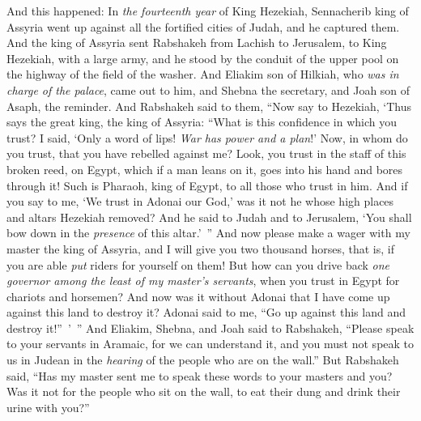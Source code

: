\begin{biblechapter} %
 And this happened: In \textit{the fourteenth year} of King Hezekiah, Sennacherib king of Assyria went up against all the fortified cities of Judah, and he captured them.
\verse And the king of Assyria sent Rabshakeh from Lachish to Jerusalem, to King Hezekiah, with a large army, and he stood by the conduit of the upper pool on the highway of the field of the washer.
\verse And Eliakim son of Hilkiah, who \textit{was in charge of the palace}, came out to him, and Shebna the secretary, and Joah son of Asaph, the reminder.
\verse And Rabshakeh said to them, “Now say to Hezekiah, ‘Thus says the great king, the king of Assyria: “What is this confidence in which you trust?
\verse I said, ‘Only a word of lips! \textit{War has power and a plan}!’ Now, in whom do you trust, that you have rebelled against me?
\verse Look, you trust in the staff of this broken reed, on Egypt, which if a man leans on it, goes into his hand and bores through it! Such is Pharaoh, king of Egypt, to all those who trust in him.
\verse And if you say to me, ‘We trust in Adonai our God,’ was it not he whose high places and altars Hezekiah removed? And he said to Judah and to Jerusalem, ‘You shall bow down in the \textit{presence} of this altar.’ ”
\verse And now please make a wager with my master the king of Assyria, and I will give you two thousand horses, that is, if you are able \textit{put} riders for yourself on them!
\verse But how can you drive back \textit{one governor among the least of my master’s servants}, when you trust in Egypt for chariots and horsemen?
\verse And now was it without Adonai that I have come up against this land to destroy it? Adonai said to me, “Go up against this land and destroy it!” ’ ”
\verse And Eliakim, Shebna, and Joah said to Rabshakeh, “Please speak to your servants in Aramaic, for we can understand it, and you must not speak to us in Judean in the \textit{hearing} of the people who are on the wall.”
\verse But Rabshakeh said, “Has my master sent me to speak these words to your masters and you? Was it not for the people who sit on the wall, to eat their dung and drink their urine with you?”

\end{biblechapter}
